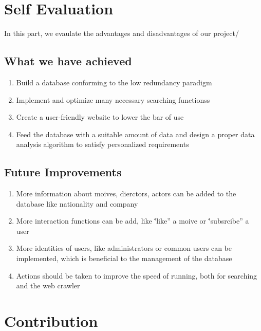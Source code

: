 \begin{CJK*}{UTF8}{gbsn}
\section{Self Evaluation}
In this part, we evaulate the advantages and disadvantages of our project/
\subsection{What we have achieved}
\begin{enumerate}
\item Build a database conforming to the low redundancy paradigm
\item Implement and optimize many necessary  searching functionss
\item Create a user-friendly website to lower the bar of use
\item Feed the database with a suitable amount of data and design a proper data analysis algorithm to satisfy personalized requirements
\end{enumerate}
\subsection{Future Improvements}
\begin{enumerate}
\item More information about moives, dierctors, actors can be added to the database like nationality and company
\item More interaction functions can be add, like \''like'' a moive or \''subsrcibe'' a user
\item More identities of users, like administrators or common users can be implemented, which is beneficial to the management of the database
\item Actions should be taken to improve the speed of running, both for searching and the web crawler
\end{enumerate}
\section{Contribution}

\end{CJK*}
